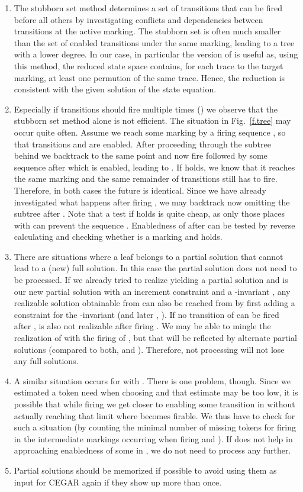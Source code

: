 \documentclass{LMCS}
\begin{document}
\begin{enumerate}[(1)]
\item The stubborn set method \cite{ksv06} determines a set of transitions that can be fired before all others by
investigating conflicts and dependencies between transitions at the active marking. The stubborn set is often much smaller than
the set of enabled transitions under the same marking, leading to a tree with a lower degree. In our case, in particular the version
of \cite{schmidt_atpn99} is useful as, using this method, the reduced state space contains, for each trace to the target marking,
at least one permution of the same trace. Hence, the reduction is consistent with the given solution of the state equation.
\item Especially if transitions should fire multiple times () we observe that the stubborn set
method alone is not efficient. The situation in Fig.~\ref{f.tree} may occur quite often. Assume we reach some marking
 by a firing sequence , so that transitions  and  are enabled. After proceeding through the
subtree behind  we backtrack to the same point and now fire  followed by some sequence  after which 
is enabled, leading to . If  holds, we know that
it reaches the same marking  and the same remainder  of transitions still has to fire. Therefore, in
both cases the future is identical. Since we have already investigated what happens after firing ,
we may backtrack now omitting the subtree after . Note that a test if  holds
is quite cheap, as only those places  with  can prevent the sequence .
Enabledness of  after  can be tested by reverse calculating  and 
checking whether  is a marking and  holds. 
\item There are situations where a leaf belongs to a partial solution  that cannot lead to a (new) full solution. In this
case the partial solution does not need to be processed. If we already tried to realize  yielding a partial solution
 and  is our new partial solution with an increment constraint 
and a -invariant , any realizable solution  obtainable from  can also be reached from  by first
adding a constraint  for the -invariant  (and later , ). If no transition of  can be fired after ,
 is also not realizable after firing . We may be able to
mingle the realization of  with the firing of , but that will be reflected by alternate partial solutions
(compared to both,  and ). Therefore, not processing  will not lose any full solutions.
\item A similar situation occurs for  with . There is one problem,
though. Since we estimated a token need when choosing  and that estimate may be too low, it is possible that while
firing  we get closer to enabling some transition  in  without actually reaching that limit where 
becomes firable. We thus have to check for such a situation (by counting the minimal number of missing tokens for
firing  in the intermediate markings occurring when firing  and ). If  does not help in
approaching enabledness of some  in , we do not need to process  any further.
\item Partial solutions should be memorized if possible to avoid using them as input for CEGAR again if they show up more than once.
\end{enumerate}
\end{document}
